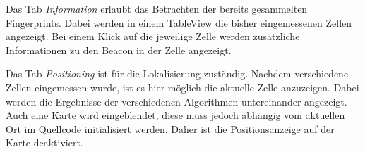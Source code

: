 Das Tab \emph{Information} erlaubt das Betrachten der bereits gesammelten Fingerprints. Dabei werden in einem TableView die bisher eingemessenen Zellen angezeigt. Bei einem Klick auf die jeweilige Zelle werden zusätzliche Informationen zu den Beacon in der Zelle angezeigt.

Das Tab \emph{Positioning} ist für die Lokalisierung zuständig. Nachdem verschiedene Zellen eingemessen wurde, ist es hier möglich die aktuelle Zelle anzuzeigen.
Dabei werden die Ergebnisse der verschiedenen Algorithmen untereinander angezeigt. 
Auch eine Karte wird eingeblendet, diese muss jedoch abhängig vom aktuellen Ort im Quellcode initialisiert werden. Daher ist die Positionsanzeige auf der Karte deaktiviert.
